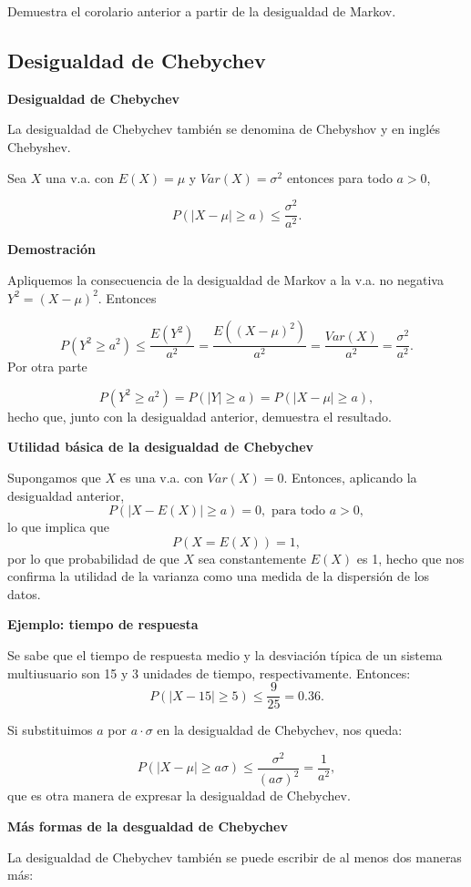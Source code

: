 \documentclass[
  letterpaper,
  DIV=11,
  numbers=noendperiod]{scrreprt}
\begin{document}
Demuestra el corolario anterior a partir de la desigualdad de Markov.

\hypertarget{desigualdad-de-chebychev}{%
\subsection{Desigualdad de Chebychev}\label{desigualdad-de-chebychev}}

\textbf{Desigualdad de Chebychev}

La desigualdad de Chebychev también se denomina de Chebyshov y en inglés
Chebyshev.

Sea \(X\) una v.a. con \(E(X)=\mu\) y \(Var(X)=\sigma^2\) entonces para
todo \(a>0\),

\[P(|X-\mu|\geq a)\leq \frac{\sigma^2}{a^2}.\]

\textbf{Demostración}

Apliquemos la consecuencia de la desigualdad de Markov a la v.a. no
negativa \(Y^2=(X-\mu)^2\). Entonces

\[
P(Y^2\geq a^2) \leq 
\frac{E(Y^2)}{a^2}=\frac{E((X-\mu)^2)}{a^2}
= \frac{Var(X)}{a^2}=\frac{\sigma^2}{a^2}.
\] Por otra parte

\[
P(Y^2\geq a^2)=P(|Y|\geq a)= P(|X-\mu|\geq a),
\] hecho que, junto con la desigualdad anterior, demuestra el resultado.

\textbf{Utilidad básica de la desigualdad de Chebychev}

Supongamos que \(X\) es una v.a. con \(Var(X)=0\). Entonces, aplicando
la desigualdad anterior, \[P(|X-E(X)|\geq a )=0,\mbox{ para todo }a>0,\]
lo que implica que \[P(X=E(X))=1,\] por lo que probabilidad de que \(X\)
sea constantemente \(E(X)\) es 1, hecho que nos confirma la utilidad de
la varianza como una medida de la dispersión de los datos.

\textbf{Ejemplo: tiempo de respuesta}

Se sabe que el tiempo de respuesta medio y la desviación típica de un
sistema multiusuario son 15 y 3 unidades de tiempo, respectivamente.
Entonces: \[
P(|X-15|\geq 5)\leq \frac9{25}=0.36.
\]

Si substituimos \(a\) por \(a\cdot \sigma\) en la desigualdad de
Chebychev, nos queda:

\[
P(|X-\mu|\geq a \sigma)\leq
\frac{\sigma^2}{(a\sigma)^2}=\frac1{a^2},
\] que es otra manera de expresar la desigualdad de Chebychev.

\textbf{Más formas de la desgualdad de Chebychev}

La desigualdad de Chebychev también se puede escribir de al menos dos
maneras más:
\end{document}
